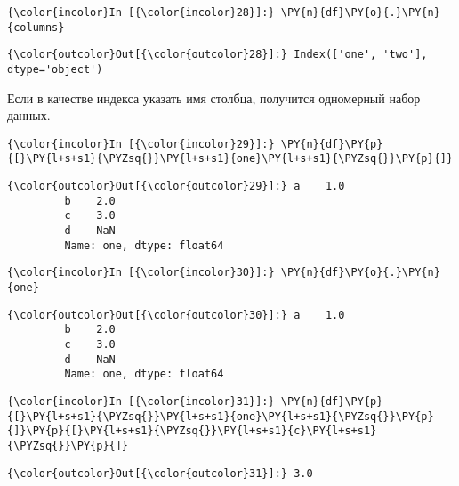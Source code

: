     \begin{Verbatim}[commandchars=\\\{\}]
{\color{incolor}In [{\color{incolor}28}]:} \PY{n}{df}\PY{o}{.}\PY{n}{columns}
\end{Verbatim}

            \begin{Verbatim}[commandchars=\\\{\}]
{\color{outcolor}Out[{\color{outcolor}28}]:} Index(['one', 'two'], dtype='object')
\end{Verbatim}
        
    Если в качестве индекса указать имя столбца, получится одномерный набор
данных.

    \begin{Verbatim}[commandchars=\\\{\}]
{\color{incolor}In [{\color{incolor}29}]:} \PY{n}{df}\PY{p}{[}\PY{l+s+s1}{\PYZsq{}}\PY{l+s+s1}{one}\PY{l+s+s1}{\PYZsq{}}\PY{p}{]}
\end{Verbatim}

            \begin{Verbatim}[commandchars=\\\{\}]
{\color{outcolor}Out[{\color{outcolor}29}]:} a    1.0
         b    2.0
         c    3.0
         d    NaN
         Name: one, dtype: float64
\end{Verbatim}
        
    \begin{Verbatim}[commandchars=\\\{\}]
{\color{incolor}In [{\color{incolor}30}]:} \PY{n}{df}\PY{o}{.}\PY{n}{one}
\end{Verbatim}

            \begin{Verbatim}[commandchars=\\\{\}]
{\color{outcolor}Out[{\color{outcolor}30}]:} a    1.0
         b    2.0
         c    3.0
         d    NaN
         Name: one, dtype: float64
\end{Verbatim}
        
    \begin{Verbatim}[commandchars=\\\{\}]
{\color{incolor}In [{\color{incolor}31}]:} \PY{n}{df}\PY{p}{[}\PY{l+s+s1}{\PYZsq{}}\PY{l+s+s1}{one}\PY{l+s+s1}{\PYZsq{}}\PY{p}{]}\PY{p}{[}\PY{l+s+s1}{\PYZsq{}}\PY{l+s+s1}{c}\PY{l+s+s1}{\PYZsq{}}\PY{p}{]}
\end{Verbatim}

            \begin{Verbatim}[commandchars=\\\{\}]
{\color{outcolor}Out[{\color{outcolor}31}]:} 3.0
\end{Verbatim}
        
